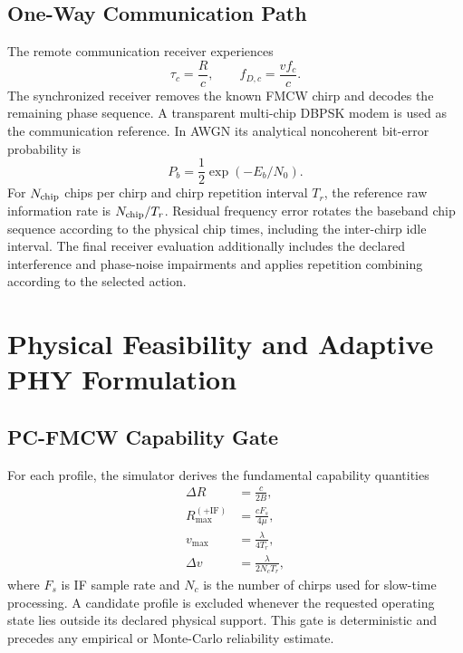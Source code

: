\documentclass[journal]{IEEEtran}
\begin{document}
\subsection{One-Way Communication Path}
The remote communication receiver experiences
\begin{equation}
 \tau_c=\frac{R}{c}, \qquad f_{D,c}=\frac{vf_c}{c}.
\end{equation}
The synchronized receiver removes the known FMCW chirp and decodes the remaining phase sequence. A transparent multi-chip DBPSK modem is used as the communication reference. In AWGN its analytical noncoherent bit-error probability is
\begin{equation}
 P_b=\frac{1}{2}\exp(-E_b/N_0).
\end{equation}
For $N_{\rm chip}$ chips per chirp and chirp repetition interval $T_r$, the reference raw information rate is $N_{\rm chip}/T_r$. Residual frequency error rotates the baseband chip sequence according to the physical chip times, including the inter-chirp idle interval. The final receiver evaluation additionally includes the declared interference and phase-noise impairments and applies repetition combining according to the selected action.

\section{Physical Feasibility and Adaptive PHY Formulation}
\label{sec:method}
\subsection{PC-FMCW Capability Gate}
For each profile, the simulator derives the fundamental capability quantities
\begin{align}
 \Delta R &= \frac{c}{2B},\\
 R_{\max}^{(+\mathrm{IF})} &= \frac{cF_s}{4\mu},\\
 v_{\max} &= \frac{\lambda}{4T_r},\\
 \Delta v &= \frac{\lambda}{2N_cT_r},
\end{align}
where $F_s$ is IF sample rate and $N_c$ is the number of chirps used for slow-time processing. A candidate profile is excluded whenever the requested operating state lies outside its declared physical support. This gate is deterministic and precedes any empirical or Monte-Carlo reliability estimate.
\end{document}
